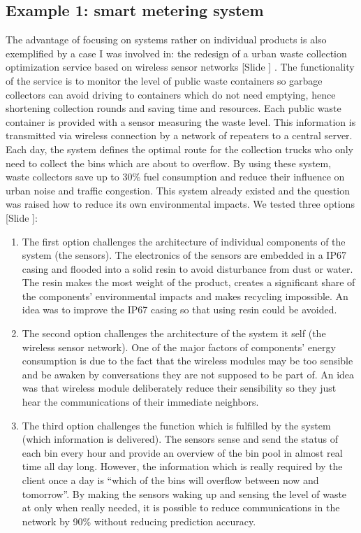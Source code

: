 \documentclass{article}
\newcounter{slide}
\begin{document}
\subsection{Example 1: smart metering system}
\label{sec:smartcity}
The advantage of focusing on systems rather on individual products is also exemplified by a case I was involved in: the redesign of a urban waste collection optimization service based on wireless sensor networks {\color{blue}[Slide ]} \cite{bonvoisinAnalyseEnvironnementaleEcoconception2012}. The functionality of the service is to monitor the level of public waste containers so garbage collectors can avoid driving to containers which do not need emptying, hence shortening collection rounds and saving time and resources. Each public waste container is provided with a sensor measuring the waste level. This information is transmitted via wireless connection by a network of repeaters to a central server. Each day, the system defines the optimal route for the collection trucks who only need to collect the bins which are about to overflow. By using these system, waste collectors save up to 30\% fuel consumption and reduce their influence on urban noise and traffic congestion. This system already existed and the question was raised how to reduce its own environmental impacts. We tested three options {\color{blue}[Slide ]}:
\begin{enumerate}
	\item The first option challenges the architecture of individual components of the system (the sensors). The electronics of the sensors are embedded in a IP67 casing and flooded into a solid resin to avoid disturbance from dust or water. The resin makes the most weight of the product, creates a significant share of the components' environmental impacts and makes recycling impossible. An idea was to improve the IP67 casing so that using resin could be avoided.
	\item The second option challenges the architecture of the system it self (the wireless sensor network). One of the major factors of components' energy consumption is due to the fact that the wireless modules may be too sensible and be awaken by conversations they are not supposed to be part of. An idea was that wireless module deliberately reduce their sensibility so they just hear the communications of their immediate neighbors. 
	\item The third option challenges the function which is fulfilled by the system (which information is delivered). The sensors sense and send the status of each bin every hour and provide an overview of the bin pool in almost real time all day long. However, the information which is really required by the client once a day is ``which of the bins will overflow between now and tomorrow''. By making the sensors waking up and sensing the level of waste at only when really needed, it is possible to reduce communications in the network by 90\% without reducing prediction accuracy.
\end{enumerate}
\end{document}
